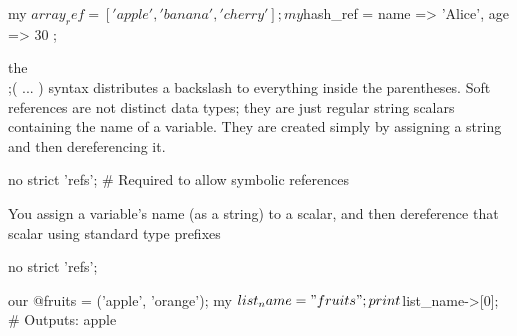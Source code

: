\documentclass{report}
\begin{document}
\begin{itemize}
            \begin{perlcode}
            my $array_ref = [ 'apple', 'banana', 'cherry' ];
            my $hash_ref = { name => 'Alice', age => 30 };
            \end{perlcode}
            \bigbreak \noindent 
            the \string\\;( ... ) syntax distributes a backslash to everything inside the parentheses.
            \bigbreak \noindent 
            Soft references are not distinct data types; they are just regular string scalars containing the name of a variable. They are created simply by assigning a string and then dereferencing it.
            \bigbreak \noindent 
            \begin{perlcode}
            no strict 'refs'; # Required to allow symbolic references
            \end{perlcode}
            \bigbreak \noindent 
            You assign a variable's name (as a string) to a scalar, and then dereference that scalar using standard type prefixes
            \bigbreak \noindent 
            \bigbreak \noindent 
            \begin{perlcode}
                no strict 'refs';

                our @fruits = ('apple', 'orange');
                my $list_name = "fruits";

                print $list_name->[0]; # Outputs: apple
            \end{perlcode}


    \end{itemize}
\end{document}
